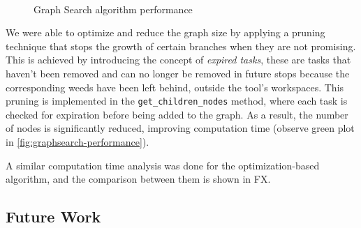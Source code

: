\begin{figure}[htb]
    \myfloatalign
     \quad
     \\
    \caption{Graph Search algorithm performance}\label{fig:graphsearch-performance}
\end{figure}

We were able to optimize and reduce the graph size by applying a pruning technique that stops the growth of certain branches when they are not promising. This is achieved by introducing the concept of \textit{expired tasks}, these are tasks that haven't been removed and can no longer be removed in future stops because the corresponding weeds have been left behind, outside the tool's workspaces. This pruning is implemented in the \texttt{get\_children\_nodes} method, where each task is checked for expiration before being added to the graph. As a result, the number of nodes is significantly reduced, improving computation time (observe green plot in \autoref{fig:graphsearch-performance}).

A similar computation time analysis was done for the optimization-based algorithm, and the comparison between them is shown in FX.

\subsection{Future Work}

